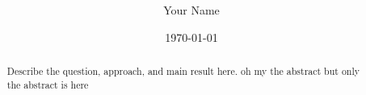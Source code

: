 \documentclass[11pt]{article}
\title{  }
\author{ Your Name }
\date{\today}
\begin{document}
\maketitle
\begin{abstract}
Describe the question, approach, and main result here. oh my the abstract but only the abstract is here
\end{abstract}


\printbibliography
\end{document}
